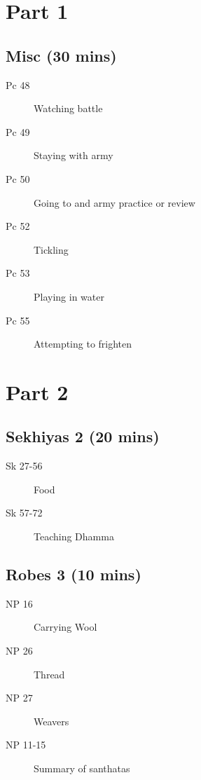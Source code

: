 \documentclass[11pt,oneside]{memoir}
\begin{document}
\begin{multicols}{2}

\section{Part 1}

\subsection{Misc (30 mins)}

\begin{description}
\item[Pc 48] Watching battle
\item[Pc 49] Staying with army
\item[Pc 50] Going to and army practice or review
\item[Pc 52] Tickling
\item[Pc 53] Playing in water
\item[Pc 55] Attempting to frighten
\end{description}

\columnbreak

\section{Part 2}

\subsection{Sekhiyas 2 (20 mins)}

\begin{description}
\item[Sk 27-56] Food
\item[Sk 57-72] Teaching Dhamma
\end{description}

\subsection{Robes 3 (10 mins)}

\begin{description}
\item[NP 16] Carrying Wool
\item[NP 26] Thread
\item[NP 27] Weavers
\item[NP 11-15] Summary of santhatas
\end{description}

\end{multicols}
\end{document}
